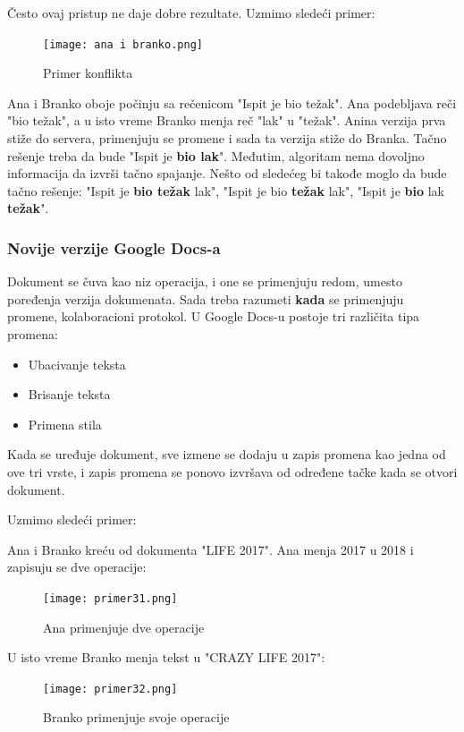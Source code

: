\documentclass[12pt]{article}
\begin{document}
Često ovaj pristup ne daje dobre rezultate. Uzmimo sledeći primer:

\begin{figure}[h]
	\centering
	\texttt{[image: ana i branko.png]}
	\caption{Primer konflikta}
	\label{fig:nls_demo}
\end{figure}

Ana i Branko oboje počinju sa rečenicom "Ispit je bio težak". Ana podebljava reči "bio težak", a u isto vreme Branko menja reč "lak" u "težak". Anina verzija prva stiže do servera, primenjuju se promene i sada ta verzija stiže do Branka. Tačno rešenje treba da bude "Ispit je \textbf{bio lak}". Međutim, algoritam nema dovoljno informacija da izvrši tačno spajanje. Nešto od sledećeg bi takođe moglo da bude tačno rešenje: "Ispit je \textbf{bio težak} lak", "Ispit je bio \textbf{težak} lak", "Ispit je  \textbf{bio} lak \textbf{težak}".

\subsubsection{Novije verzije Google Docs-a}

Dokument se čuva kao niz operacija, i one se primenjuju redom, umesto poređenja verzija dokumenata. Sada treba razumeti \textbf{kada} se primenjuju promene, kolaboracioni protokol. U Google Docs-u postoje tri različita tipa promena:

\begin{itemize}
	\item Ubacivanje teksta
	\item Brisanje teksta
	\item Primena stila
\end{itemize}

Kada se uređuje dokument, sve izmene se dodaju u zapis promena kao jedna od ove tri vrste, i zapis promena se ponovo izvršava od određene tačke kada se otvori dokument.

Uzmimo sledeći primer:

Ana i Branko kreću od dokumenta "LIFE 2017". Ana menja 2017 u 2018 i zapisuju se dve operacije:

\begin{figure}[H]
	\centering
	\texttt{[image: primer31.png]}
	\caption{Ana primenjuje dve operacije}
	\label{fig:nls_demo}
\end{figure}

U isto vreme Branko menja tekst u "CRAZY LIFE 2017":

\begin{figure}[H]
	\centering
	\texttt{[image: primer32.png]}
	\caption{Branko primenjuje svoje operacije}
	\label{fig:nls_demo}
\end{figure}
\end{document}
